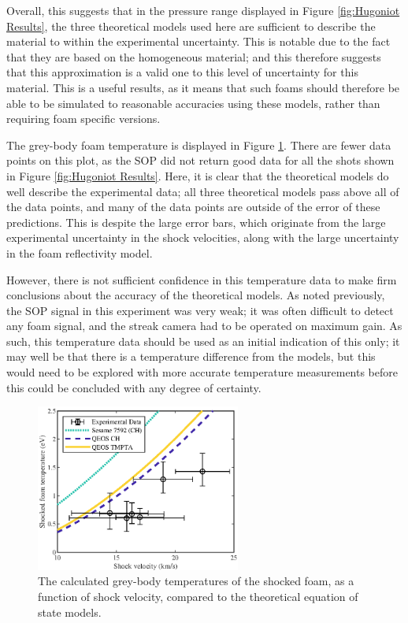 Overall, this suggests that in the pressure range displayed in Figure \ref{fig:Hugoniot Results}, the three theoretical models used here are sufficient to describe the material to within the experimental uncertainty. This is notable due to the fact that they are based on the homogeneous material; and this therefore suggests that this approximation is a valid one to this level of uncertainty for this material. This is a useful results, as it means that such foams should therefore be able to be simulated to reasonable accuracies using these models, rather than requiring foam specific versions.

The grey-body foam temperature is displayed in Figure \ref{fig:SOP Temp Results}. There are fewer data points on this plot, as the SOP did not return good data for all the shots shown in Figure \ref{fig:Hugoniot Results}. Here, it is clear that the theoretical models do well describe the experimental data; all three theoretical models pass above all of the data points, and many of the data points are outside of the error of these predictions. This is despite the large error bars, which originate from the large experimental uncertainty in the shock velocities, along with the large uncertainty in the foam reflectivity model.

However, there is not sufficient confidence in this temperature data to make firm conclusions about the accuracy of the theoretical models. As noted previously, the SOP signal in this experiment was very weak; it was often difficult to detect any foam signal, and the streak camera had to be operated on maximum gain. As such, this temperature data should be used as an initial indication of this only; it may well be that there is a temperature difference from the models, but this would need to be explored with more accurate temperature measurements before this could be concluded with any degree of certainty.

\begin{figure} [h!]
\begin{centering}
\includegraphics[width=0.6\textwidth]{figures/Experiment/Temp.eps}%
\caption{\label{fig:SOP Temp Results} The calculated grey-body temperatures of the shocked foam, as a function of shock velocity, compared to the theoretical equation of state models.}
\end{centering}
\end{figure}

